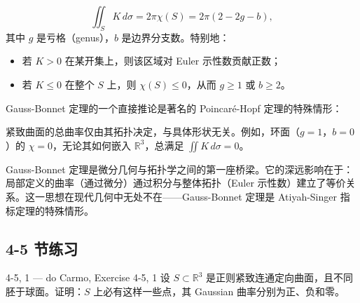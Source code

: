 \begin{Corollary}[紧致曲面总曲率的拓扑约束]\label{cor:total-curvature}
\[
\iint_S K\, d\sigma = 2\pi\chi(S) = 2\pi(2-2g - b),
\]
其中 $g$ 是亏格（genus），$b$ 是边界分支数。特别地：
\begin{itemize}
\item 若 $K > 0$ 在某开集上，则该区域对 Euler 示性数贡献正数；
\item 若 $K \leq 0$ 在整个 $S$ 上，则 $\chi(S) \leq 0$，从而 $g \geq 1$ 或 $b \geq 2$。
\end{itemize}
\end{Corollary}

Gauss-Bonnet 定理的一个直接推论是著名的 Poincaré-Hopf 定理的特殊情形：

\begin{Corollary}\label{cor:curvature-euler}
紧致曲面的总曲率仅由其拓扑决定，与具体形状无关。例如，环面（$g=1$，$b=0$）的 $\chi = 0$，无论其如何嵌入 $\mathbb{R}^3$，总满足 $\iint K\, d\sigma = 0$。
\end{Corollary}

\begin{Remark}
Gauss-Bonnet 定理是微分几何与拓扑学之间的第一座桥梁。它的深远影响在于：局部定义的曲率（通过微分）通过积分与整体拓扑（Euler 示性数）建立了等价关系。这一思想在现代几何中无处不在——Gauss-Bonnet 定理是 Atiyah-Singer 指标定理的特殊情形。
\end{Remark}

\subsection*{4-5 节练习}

\begin{exercise}{4-5, 1 — do Carmo, Exercise 4-5, 1}
设 $S \subset \mathbb{R}^3$ 是正则紧致连通定向曲面，且不同胚于球面。证明：$S$ 上必有这样一些点，其 Gaussian 曲率分别为正、负和零。
\end{exercise}

